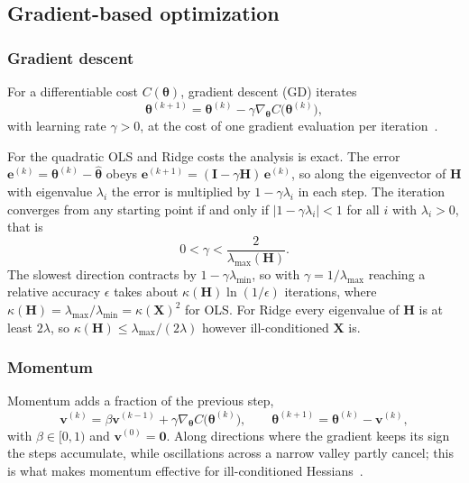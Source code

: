\subsection{Gradient-based optimization}
\label{subsec:gradient-descent}

\subsubsection{Gradient descent}
For a differentiable cost $C(\bm{\theta})$, gradient descent (GD) iterates
\begin{equation}\label{eq:gd_basic}
    \bm{\theta}^{(k+1)} = \bm{\theta}^{(k)} - \gamma
    \nabla_{\bm{\theta}} C\big(\bm{\theta}^{(k)}\big),
\end{equation}
with learning rate $\gamma > 0$, at the cost of one gradient evaluation per
iteration~\cite{hjorth-jensen_2026}.

For the quadratic OLS and Ridge costs the analysis is exact. The error
$\bm{e}^{(k)} = \bm{\theta}^{(k)} - \hat{\bm{\theta}}$ obeys
$\bm{e}^{(k+1)} = (\bm{I} - \gamma\bm{H})\,\bm{e}^{(k)}$, so along the
eigenvector of $\bm{H}$ with eigenvalue $\lambda_i$ the error is multiplied by
$1-\gamma\lambda_i$ in each step. The iteration converges from any starting
point if and only if $|1-\gamma\lambda_i| < 1$ for all $i$ with
$\lambda_i > 0$, that is
\begin{equation}\label{eq:gd_stability}
    0 < \gamma < \frac{2}{\lambda_{\max}(\bm{H})}.
\end{equation}
The slowest direction contracts by $1-\gamma\lambda_{\min}$, so with
$\gamma = 1/\lambda_{\max}$ reaching a relative accuracy $\epsilon$ takes about
$\kappa(\bm{H})\ln(1/\epsilon)$ iterations, where $\kappa(\bm{H}) =
\lambda_{\max}/\lambda_{\min} = \kappa(\bm{X})^2$ for OLS.
For Ridge every eigenvalue of $\bm{H}$ is at least $2\lambda$, so
$\kappa(\bm{H}) \leq \lambda_{\max}/(2\lambda)$ however ill-conditioned $\bm{X}$ is.

\subsubsection{Momentum}
Momentum adds a fraction of the previous step,
\begin{equation}\label{eq:gd_momentum}
    \bm{v}^{(k)} = \beta\bm{v}^{(k-1)} + \gamma\nabla_{\bm{\theta}}
    C\big(\bm{\theta}^{(k)}\big), \qquad
    \bm{\theta}^{(k+1)} = \bm{\theta}^{(k)} - \bm{v}^{(k)},
\end{equation}
with $\beta\in[0,1)$ and $\bm{v}^{(0)} = \bm{0}$. Along directions where the
gradient keeps its sign the steps accumulate, while oscillations across a narrow
valley partly cancel; this is what makes momentum effective for ill-conditioned
Hessians~\cite{goodfellow_2016,hjorth-jensen_2026}.

